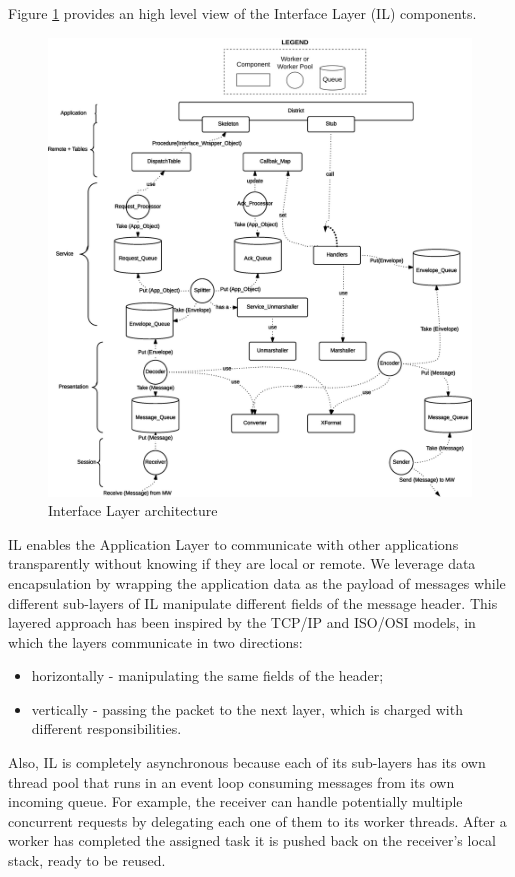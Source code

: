 
Figure \ref{fig:impl-il-arch} provides an high level view of
the Interface Layer (IL) components.

\begin{figure}[H]
  \centering
  \includegraphics[width=\columnwidth]{images/implementation/il-overall.eps}
  \caption{Interface Layer architecture}
  \label{fig:impl-il-arch}
\end{figure}

IL enables the Application Layer to communicate with other applications
transparently without knowing if they are local or remote. We leverage data
encapsulation by wrapping the application data as the payload of messages while
different sub-layers of IL manipulate different fields of the
message header.
This layered approach has been inspired by the TCP/IP and ISO/OSI models, in
which the layers communicate in two directions:
\begin{itemize}
	\item horizontally - manipulating the same fields of the header;
	\item vertically  - passing the packet to the next
layer, which is charged with different responsibilities.
\end{itemize}
Also, IL is completely asynchronous because each of its sub-layers has its own
thread pool that runs in an event loop consuming messages from its own incoming
queue. For example, the receiver can handle potentially multiple concurrent
requests by delegating each one of them to its worker threads. After a worker has
completed the assigned task it is pushed back on the receiver's local stack,
ready to be reused.


